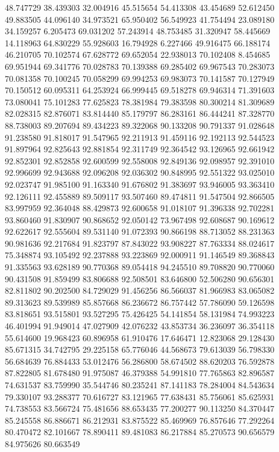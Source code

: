 48.747729
38.439303
32.004916
45.515654
54.413308
43.454689
52.612450
49.883505
44.096140
34.973521
65.950402
56.549923
41.754494
23.089180
34.159257
6.205473
69.031202
57.243914
48.753485
31.320947
58.445669
14.118963
64.830229
55.928603
16.794928
6.227466
49.916475
66.188174
46.210705
70.102574
67.628772
69.652054
22.938013
70.102408
8.454685
69.951944
69.341776
70.028783
70.139388
69.285402
69.967543
70.283073
70.081358
70.100245
70.058299
69.994253
69.983073
70.141587
70.127949
70.150512
60.095311
64.253924
66.999445
69.518278
69.946314
71.391603
73.080041
75.101283
77.625823
78.381984
79.383598
80.300214
81.309689
82.028315
82.876071
83.814440
85.179797
86.283161
86.444241
87.328770
88.738003
89.207694
89.434223
89.322068
90.133208
90.791337
91.028648
91.238580
91.818017
91.547965
92.211913
91.459116
92.192113
92.544523
91.897964
92.825643
92.881854
92.311749
92.364542
93.126965
92.661942
92.852301
92.852858
92.600599
92.558008
92.849136
92.098957
92.391010
92.996699
92.943688
92.096208
92.036302
90.848995
92.551322
93.025010
92.023747
91.985100
91.163340
91.676802
91.383697
93.946005
93.363410
92.126111
92.455889
89.509117
93.507460
89.474811
91.547504
92.866505
83.997959
92.364048
88.429873
92.600658
91.018107
91.396338
92.702281
93.860460
91.830907
90.868652
92.050142
73.967498
92.608687
90.169612
92.622617
92.555604
89.531140
91.072393
90.866198
88.713052
88.231363
90.981636
92.217684
91.823797
87.843022
93.908227
87.763334
88.024617
75.348874
93.105492
92.237888
93.223869
92.000911
91.146549
89.368843
91.335563
93.628189
90.770368
89.054418
94.245510
89.708820
90.770060
90.431508
91.859499
83.806688
92.508501
83.646800
52.506280
90.656301
82.811802
90.202500
84.729029
91.456256
86.566037
81.966983
83.065082
89.313623
89.539989
85.857668
86.236672
86.757442
57.786090
59.126598
83.818651
93.515801
93.527295
75.426425
54.141854
58.131984
74.993223
46.401994
91.949014
47.027909
42.076232
43.853734
36.236097
36.354118
55.614600
19.968423
60.896958
61.910476
17.646471
12.823068
29.128430
85.671315
34.742795
29.225158
65.776046
44.568673
79.613039
56.798330
56.684639
76.884433
53.012476
56.286800
58.674502
88.620203
76.592878
87.822805
81.678480
91.975087
46.379388
54.991810
77.765863
82.896587
74.631537
83.759990
35.544746
80.235241
87.141183
78.284004
84.543634
79.330107
93.288377
70.616727
83.121965
77.638431
85.756061
85.625931
74.738553
83.566724
75.481656
88.653435
77.200277
90.113250
84.370447
85.245558
86.886671
86.212931
83.875522
85.469969
76.857646
77.292264
80.470472
82.101667
78.890411
89.481083
86.217884
85.270573
90.656579
84.975626
80.663549
